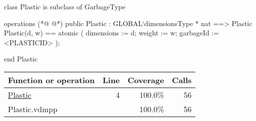 \begin{vdmpp}[breaklines=true]
class Plastic is subclass of GarbageType

operations
(*@
\label{Plastic:4}
@*)
public Plastic : GLOBAL`dimensionsType * nat ==> Plastic
Plastic(d, w) == 
    atomic 
    (
        dimensions := d;
        weight := w;
        garbageId := <PLASTICID>
    );


end Plastic
\end{vdmpp}
\bigskip
\begin{longtable}{|l|r|r|r|}
\hline
Function or operation & Line & Coverage & Calls \\
\hline
\hline
\hyperref[Plastic:4]{Plastic} & 4&100.0\% & 56 \\
\hline
\hline
Plastic.vdmpp & & 100.0\% & 56 \\
\hline
\end{longtable}

